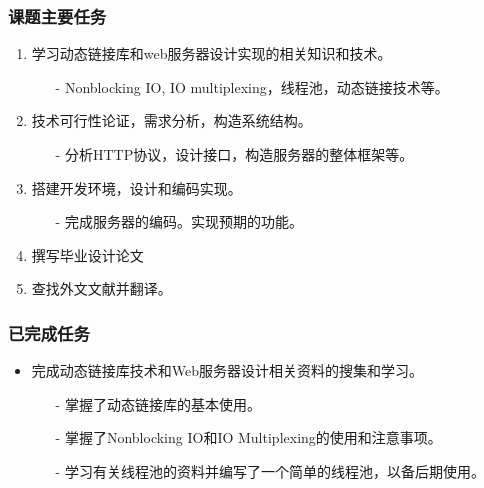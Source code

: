 \documentclass[12pt]{beamer}
\begin{document}
\begin{CJK}{UTF8}{gbsn}
\begin{frame}
	\frametitle{课题主要任务}
	\begin{enumerate}
		\item 学习动态链接库和web服务器设计实现的相关知识和技术。
		\begin{itemize}
			\item[-] Nonblocking IO, IO multiplexing，线程池，动态链接技术等。
		\end{itemize}
		\pause
		\item 技术可行性论证，需求分析，构造系统结构。
		\begin{itemize}
			\item[-] 分析HTTP协议，设计接口，构造服务器的整体框架等。
		\end{itemize}
		\pause
		\item 搭建开发环境，设计和编码实现。
		\begin{itemize}
			\item[-] 完成服务器的编码。实现预期的功能。
		\end{itemize}
		\pause
		\item 撰写毕业设计论文
		\pause
		\item 查找外文文献并翻译。
	\end{enumerate}
\end{frame}

\begin{frame}
	\frametitle{已完成任务}
	\begin{itemize}
		\item 完成动态链接库技术和Web服务器设计相关资料的搜集和学习。
		\pause
		\begin{itemize}
			\item[-] 掌握了动态链接库的基本使用。
			\item[-] 掌握了Nonblocking IO和IO Multiplexing的使用和注意事项。
			\item[-] 学习有关线程池的资料并编写了一个简单的线程池，以备后期使用。
		\end{itemize}
	\end{itemize}
\end{frame}


\end{CJK}
\end{document}
